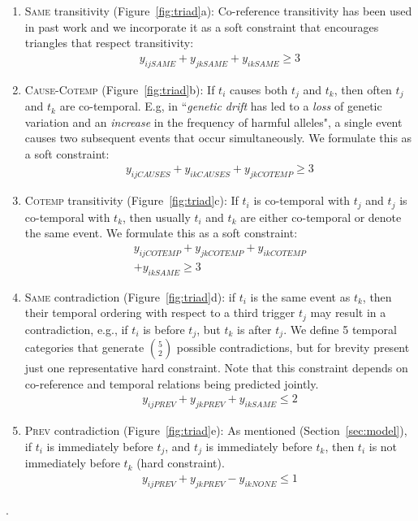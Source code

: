 \begin{enumerate}[itemsep=0pt,topsep=0pt] 
\item \textsc{Same} transitivity (Figure~\ref{fig:triad}a): Co-reference transitivity has been used in past work \cite{Finkel08} and we incorporate it as a soft constraint that encourages triangles that respect transitivity: 
\begin{align}
y_{ijSAME} + y_{jkSAME} + y_{ikSAME} \geq 3 \label{eq:sametransitivity}
\end{align}

\item \textsc{Cause}-\textsc{Cotemp} (Figure~\ref{fig:triad}b): If $t_i$ causes both $t_j$ and $t_k$, then often $t_j$ and $t_k$ are co-temporal. E.g, in ``\emph{genetic drift} has led to a \emph{loss} of genetic variation and an \emph{increase} in the frequency of harmful alleles", a single event causes two subsequent events that occur simultaneously. We formulate this as a soft constraint:
\begin{align}
y_{ijCAUSES} + y_{ikCAUSES} + y_{jkCOTEMP} \geq 3 \label{eq:causecotemp}
\end{align}

\item \textsc{Cotemp} transitivity (Figure~\ref{fig:triad}c):  If $t_i$ is co-temporal with $t_j$ and $t_j$ is co-temporal with $t_k$, then usually $t_i$ and $t_k$ are either co-temporal or denote the same event. We formulate this as a soft constraint:
\begin{multline}
y_{ijCOTEMP} + y_{jkCOTEMP}  +y_{ikCOTEMP} \\ + y_{ikSAME} \geq 3 \label{eq:cotemptransitivity}
\end{multline}

\item \textsc{Same} contradiction (Figure~\ref{fig:triad}d): if $t_i$ is the same event as  $t_k$, then their temporal ordering with respect to a third trigger $t_j$ may result in a contradiction, e.g., if $t_i$ is before $t_j$, but $t_k$ is after $t_j$. We define 5 temporal categories that generate $5 \choose 2$ possible contradictions, but for brevity present just one representative hard constraint. Note that this constraint depends on co-reference and temporal relations being predicted jointly.
\begin{align}
y_{ijPREV} + y_{jkPREV} + y_{ikSAME} \leq 2 \label{eq:samecontradiction}
\end{align}
\item \textsc{Prev} contradiction (Figure~\ref{fig:triad}e): As mentioned (Section~\ref{sec:model}), if $t_i$ is immediately before $t_j$, and $t_j$ is immediately before $t_k$, then $t_i$ is not immediately before $t_k$ (hard constraint).
\begin{align} 
y_{ijPREV} + y_{jkPREV} - y_{ikNONE} \leq 1 \label{eq:prev}
\end{align}
\end{enumerate}.

